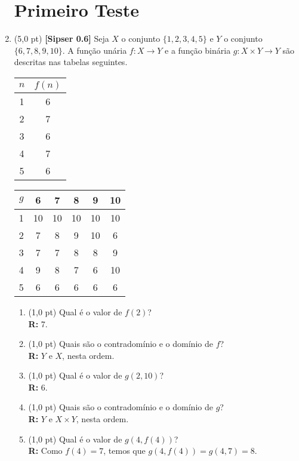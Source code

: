 \documentclass[12pt,a4paper,oneside]{article}
\begin{document}
\begin{enumerate}
	
	\section*{Primeiro Teste}
	
	\item (5,0 pt) {\bf [Sipser 0.6]} Seja $X$ o conjunto $\{1,2,3,4,5\}$ e $Y$ o conjunto $\{6,7,8,9,10\}$. A função unária
	$f : X \rightarrow Y$ e a função binária $g: X \times Y \rightarrow Y$ são descritas nas tabelas seguintes.
	
	\begin{multicols}{2}
		
		\begin{tabular}{c|c}
			$n$	&	$f(n)$	\\
			\hline
			1 	&	6	\\			
			2 	&	7	\\
			3 	&	6	\\
			4 	&	7	\\
			5 	&	6	\\
			\hline
		\end{tabular}
	
		\columnbreak
		
		\begin{tabular}{c|ccccc}
			$g$	& 	6	& 	7	& 	8	& 	9	&	10 \\
			\hline
			1	&	10	&	10	&	10	&	10	&	10 \\
			2	& 	7	& 	8	& 	9	& 	10	& 	6 \\	
			3	& 	7	& 	7	& 	8	& 	8	& 	9 \\
			4	& 	9	& 	8	& 	7	& 	6	& 	10 \\
			5	& 	6	& 	6	& 	6	& 	6	& 	6 \\
			\hline
		\end{tabular}
	
	\end{multicols}
	
	\begin{enumerate}
		\item (1,0 pt) Qual é o valor de $f(2)$? \\
						{\color{blue} {\bf R:} 7.}
		\item (1,0 pt) Quais são o contradomínio e o domínio de $f$?\\
						{\color{blue} {\bf R:} $Y$ e $X$, nesta ordem.}
		\item (1,0 pt) Qual é o valor de $g(2,10)$?\\
						{\color{blue} {\bf R:} 6.}
		\item (1,0 pt) Quais são o contradomínio e o domínio de $g$?\\
						{\color{blue} {\bf R:} $Y$ e $X \times Y$, nesta ordem.}
		\item (1,0 pt) Qual é o valor de $g(4,f(4))$?\\
						{\color{blue} {\bf R:} Como $f(4) =7$, temos que $g(4,f(4)) = g(4,7) = 8$.}
	\end{enumerate}
	

\end{enumerate}
\end{document}
